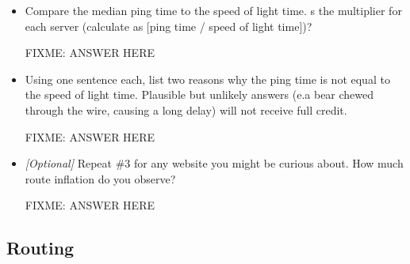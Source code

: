 \documentclass[10pt]{article}
\begin{document}
\begin{enumerate}
\begin{itemize}

\item Compare the median ping time to the speed of light time. s the multiplier for each server (calculate as [ping time / speed of light time])?

FIXME: ANSWER HERE

\item Using one sentence each, list two reasons why the ping time is not equal to the speed of light time. Plausible but unlikely answers (e.a bear chewed through the wire, causing a long delay) will not receive full credit.

FIXME: ANSWER HERE

\item \emph{[Optional]} Repeat \#3 for any website you might be curious about. How much route inflation do you observe? 

FIXME: ANSWER HERE

\end{itemize}
\end{enumerate}


\subsection*{Routing}
\end{document}

